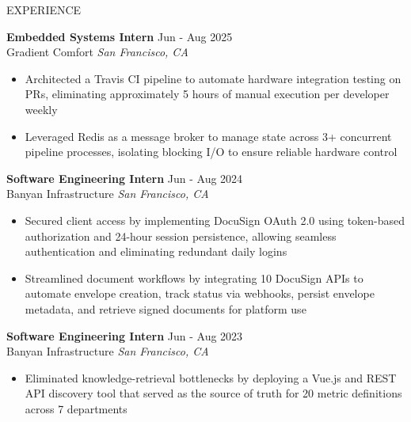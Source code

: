 \documentclass{resume} %
\begin{document}
\begin{rSection}{EXPERIENCE}

\textbf{Embedded Systems Intern} \hfill Jun - Aug 2025 \\
Gradient Comfort \hfill \textit{San Francisco, CA}
 \vspace{-.8em}
 \begin{itemize}
    \itemsep -8pt {}
     \item Architected a Travis CI pipeline to automate hardware integration testing on PRs, eliminating approximately 
     5 hours of manual execution per developer weekly
     \item Leveraged Redis as a message broker to manage state across 3+ concurrent pipeline processes,
     isolating blocking I/O to ensure reliable hardware control
 \end{itemize}

\textbf{Software Engineering Intern} \hfill Jun - Aug 2024 \\
Banyan Infrastructure \hfill \textit{San Francisco, CA}
 \vspace{-.8em}
 \begin{itemize}
    \itemsep -8pt {} 
     \item Secured client access by implementing DocuSign OAuth 2.0 using token-based authorization 
     and 24-hour session persistence, allowing seamless authentication and eliminating redundant daily logins
     \item Streamlined document workflows by integrating 10 DocuSign APIs to automate envelope creation, track status via
     webhooks, persist envelope metadata, and retrieve signed documents for platform use
 \end{itemize}

\textbf{Software Engineering Intern} \hfill Jun - Aug 2023 \\
Banyan Infrastructure \hfill \textit{San Francisco, CA}
 \vspace{-.8em}
 \begin{itemize}
    \itemsep -8pt {} 
     \item Eliminated knowledge-retrieval bottlenecks by deploying a Vue.js and REST API discovery tool
     that served as the source of truth for 20 metric definitions across 7 departments
 \end{itemize}

\end{rSection} 

\end{document}
